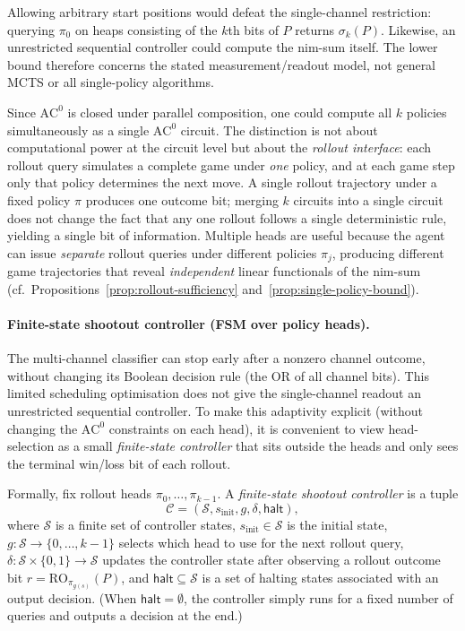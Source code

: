 \documentclass[twoside,11pt]{article}
\newcommand{\AC}{\mathrm{AC}}
\numberwithin{theorem}{section}
\numberwithin{equation}{section}
\begin{document}
Allowing arbitrary start positions would defeat the single-channel restriction: querying $\pi_0$ on heaps consisting of the $k$th bits of $P$ returns $\sigma_k(P)$. Likewise, an unrestricted sequential controller could compute the nim-sum itself. The lower bound therefore concerns the stated measurement/readout model, not general MCTS or all single-policy algorithms.



\begin{remark}
\label{rem:why-multi-head}
Since $\AC^0$ is closed under parallel composition, one could compute all $k$ policies simultaneously as a single $\AC^0$ circuit.
The distinction is not about computational power at the circuit level but about the \emph{rollout interface}: each rollout query simulates a complete game under \emph{one} policy, and at each game step only that policy determines the next move.
A single rollout trajectory under a fixed policy $\pi$ produces one outcome bit; merging $k$ circuits into a single circuit does not change the fact that any one rollout follows a single deterministic rule, yielding a single bit of information.
Multiple heads are useful because the agent can issue \emph{separate} rollout queries under different policies $\pi_j$, producing different game trajectories that reveal \emph{independent} linear functionals of the nim-sum (cf.\ Propositions~\ref{prop:rollout-sufficiency} and~\ref{prop:single-policy-bound}).
\end{remark}

\paragraph{Finite-state shootout controller (FSM over policy heads).}
\label{par:shootout-controller}
The multi-channel classifier can stop early after a nonzero channel outcome, without changing its Boolean decision rule (the OR of all channel bits). This limited scheduling optimisation does not give the single-channel readout an unrestricted sequential controller.
To make this adaptivity explicit (without changing the $\AC^0$ constraints on each head), it is convenient to view head-selection as a small \emph{finite-state controller} that sits outside the heads and only sees the terminal win/loss bit of each rollout.

Formally, fix rollout heads $\pi_0,\dots,\pi_{k-1}$.
A \emph{finite-state shootout controller} is a tuple
\[
\mathcal{C} = (\mathcal{S}, s_{\mathrm{init}}, g, \delta, \mathsf{halt}),
\]
where $\mathcal{S}$ is a finite set of controller states, $s_{\mathrm{init}}\in\mathcal{S}$ is the initial state,
$g\colon \mathcal{S}\to\{0,\dots,k-1\}$ selects which head to use for the next rollout query,
$\delta\colon \mathcal{S}\times\{0,1\}\to\mathcal{S}$ updates the controller state after observing a rollout outcome bit
$r=\mathrm{RO}_{\pi_{g(s)}}(P)$, and $\mathsf{halt}\subseteq \mathcal{S}$ is a set of halting states associated with an output decision.
(When $\mathsf{halt}=\emptyset$, the controller simply runs for a fixed number of queries and outputs a decision at the end.)
\end{document}

